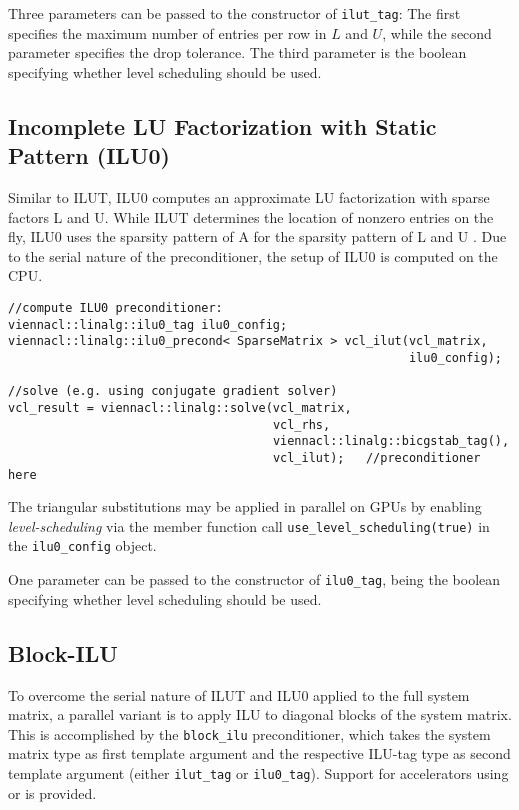 Three parameters can be passed to the constructor of \lstinline|ilut_tag|: The first specifies the maximum number of entries per row in $L$ and $U$, while the
second parameter specifies the drop tolerance. The third parameter is the boolean specifying whether level scheduling should be used.


\subsection{Incomplete LU Factorization with Static Pattern (ILU0)}
Similar to ILUT, ILU0 computes an approximate LU factorization with sparse factors L and U.
While ILUT determines the location of nonzero entries on the fly, ILU0 uses the sparsity pattern of A for the sparsity pattern of L and U \cite{saad-iterative-solution}.
Due to the serial nature of the preconditioner, the setup of ILU0 is computed on the CPU.
\begin{lstlisting}
//compute ILU0 preconditioner:
viennacl::linalg::ilu0_tag ilu0_config;
viennacl::linalg::ilu0_precond< SparseMatrix > vcl_ilut(vcl_matrix,
                                                        ilu0_config);

//solve (e.g. using conjugate gradient solver)
vcl_result = viennacl::linalg::solve(vcl_matrix,
                                     vcl_rhs,
                                     viennacl::linalg::bicgstab_tag(),
                                     vcl_ilut);   //preconditioner here
\end{lstlisting}
The triangular substitutions may be applied in parallel on GPUs by enabling \emph{level-scheduling} \cite{saad-iterative-solution} via the member function call \lstinline|use_level_scheduling(true)| in the \lstinline|ilu0_config| object.

One parameter can be passed to the constructor of \lstinline|ilu0_tag|, being the boolean specifying whether level scheduling should be used.


\subsection{Block-ILU}
To overcome the serial nature of ILUT and ILU0 applied to the full system matrix,
a parallel variant is to apply ILU to diagonal blocks of the system matrix.
This is accomplished by the \lstinline|block_ilu| preconditioner, which takes
the system matrix type as first template argument and the respective ILU-tag type as second template argument
(either \lstinline|ilut_tag| or \lstinline|ilu0_tag|). Support for accelerators using {\CUDA} or {\OpenCL} is provided.

